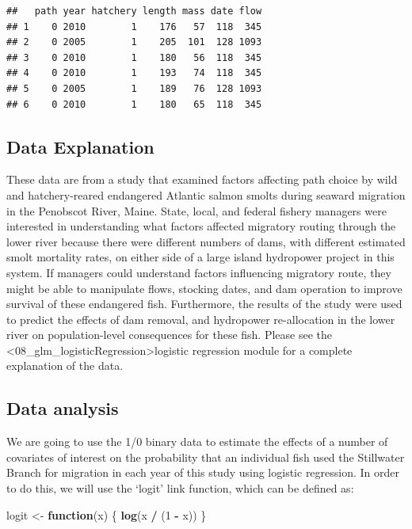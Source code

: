 \documentclass[
]{book}
\newenvironment{Shaded}{\begin{snugshade}}{\end{snugshade}}
\newcommand{\ControlFlowTok}[1]{\textcolor[rgb]{0.13,0.29,0.53}{\textbf{#1}}}
\newcommand{\DecValTok}[1]{\textcolor[rgb]{0.00,0.00,0.81}{#1}}
\newcommand{\KeywordTok}[1]{\textcolor[rgb]{0.13,0.29,0.53}{\textbf{#1}}}
\newcommand{\NormalTok}[1]{#1}
\newcommand{\OperatorTok}[1]{\textcolor[rgb]{0.81,0.36,0.00}{\textbf{#1}}}
\newcommand{\StringTok}[1]{\textcolor[rgb]{0.31,0.60,0.02}{#1}}
\begin{document}
\begin{verbatim}
##   path year hatchery length mass date flow
## 1    0 2010        1    176   57  118  345
## 2    0 2005        1    205  101  128 1093
## 3    0 2010        1    180   56  118  345
## 4    0 2010        1    193   74  118  345
## 5    0 2005        1    189   76  128 1093
## 6    0 2010        1    180   65  118  345
\end{verbatim}

\hypertarget{glmm-logistic-data}{%
\subsection{Data Explanation}\label{glmm-logistic-data}}

These data are from a study that examined factors affecting path choice by wild and hatchery-reared endangered Atlantic salmon smolts during seaward migration in the Penobscot River, Maine. State, local, and federal fishery managers were interested in understanding what factors affected migratory routing through the lower river because there were different numbers of dams, with different estimated smolt mortality rates, on either side of a large island hydropower project in this system. If managers could understand factors influencing migratory route, they might be able to manipulate flows, stocking dates, and dam operation to improve survival of these endangered fish. Furthermore, the results of the study were used to predict the effects of dam removal, and hydropower re-allocation in the lower river on population-level consequences for these fish. Please see the \textless08\_glm\_logisticRegression\textgreater logistic regression module for a complete explanation of the data.

\hypertarget{glmm-logistic-analysis}{%
\subsection{Data analysis}\label{glmm-logistic-analysis}}

We are going to use the 1/0 binary data to estimate the effects of a number of covariates of interest on the probability that an individual fish used the Stillwater Branch for migration in each year of this study using logistic regression. In order to do this, we will use the `logit' link function, which can be defined as:

\begin{Shaded}
\begin{Highlighting}[]
\NormalTok{logit <-}\StringTok{ }\ControlFlowTok{function}\NormalTok{(x) \{}
  \KeywordTok{log}\NormalTok{(x }\OperatorTok{/}\StringTok{ }\NormalTok{(}\DecValTok{1} \OperatorTok{-}\StringTok{ }\NormalTok{x))}
\NormalTok{\}}
\end{Highlighting}
\end{Shaded}
\end{document}
